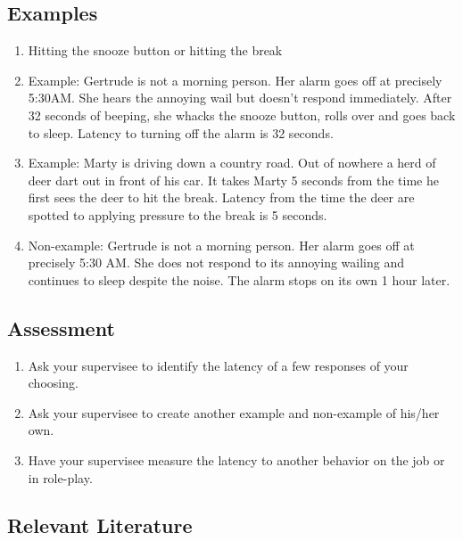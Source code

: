 \subsection{Examples}
\begin{enumerate}
\item Hitting the snooze button or hitting the break
\item Example: Gertrude is not a morning person.  Her alarm goes off at precisely 5:30AM.  She hears the annoying wail but doesn't respond immediately.  After 32 seconds of beeping, she whacks the snooze button, rolls over and goes back to sleep.  Latency to turning off the alarm is 32 seconds.
\item Example:  Marty is driving down a country road.  Out of nowhere a herd of deer dart out in front of his car.  It takes Marty 5 seconds from the time he first sees the deer to hit the break.  Latency from the time the deer are spotted to applying pressure to the break is 5 seconds.    
\item Non-example: Gertrude is not a morning person.  Her alarm goes off at precisely 5:30 AM.  She does not respond to its annoying wailing and continues to sleep despite the noise.  The alarm stops on its own 1 hour later.
\end{enumerate}
%
\subsection{Assessment}
\begin{enumerate}
\item Ask your supervisee to identify the latency of a few responses of your choosing.  
\item Ask your supervisee to create another example and non-example of his/her own.
\item Have your supervisee measure the latency to another behavior on the job or in role-play.
\end{enumerate}
%
\subsection{Relevant Literature}
\begin{refsection}
\nocite{test,alang2017police,clayton2018black}
\printbibliography[heading=none]
\end{refsection}

